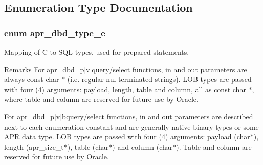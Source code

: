 \subsection{Enumeration Type Documentation}
\hypertarget{group___a_p_r___util___d_b_d_ga19608fa5d518a5121bee23daacc5c230}{
\subsubsection[{apr\-\_\-dbd\-\_\-type\-\_\-e}]{\setlength{\rightskip}{0pt plus 5cm}enum {\bf apr\-\_\-dbd\-\_\-type\-\_\-e}}}\label{group___a_p_r___util___d_b_d_ga19608fa5d518a5121bee23daacc5c230}
Mapping of C to S\-Q\-L types, used for prepared statements. \begin{DoxyRemark}{Remarks}
For apr\-\_\-dbd\-\_\-p\mbox{[}v\mbox{]}query/select functions, in and out parameters are always const char $\ast$ (i.\-e. regular nul terminated strings). L\-O\-B types are passed with four (4) arguments\-: payload, length, table and column, all as const char $\ast$, where table and column are reserved for future use by Oracle. 

For apr\-\_\-dbd\-\_\-p\mbox{[}v\mbox{]}bquery/select functions, in and out parameters are described next to each enumeration constant and are generally native binary types or some A\-P\-R data type. L\-O\-B types are passed with four (4) arguments\-: payload (char$\ast$), length (apr\-\_\-size\-\_\-t$\ast$), table (char$\ast$) and column (char$\ast$). Table and column are reserved for future use by Oracle. 
\end{DoxyRemark}
